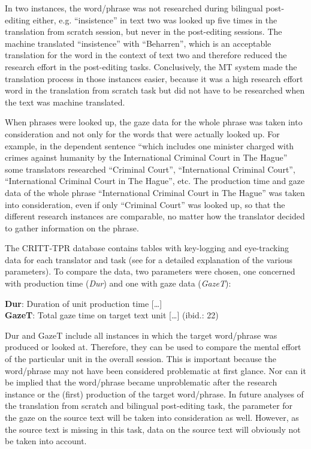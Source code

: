 \documentclass[output=paper]{langsci/langscibook}
\begin{document}
In two instances, the word/phrase was not researched during bilingual post-editing either, e.g. ``insistence'' in text two was looked up five times in the translation from scratch session, but never in the post-editing sessions. The machine translated ``insistence'' with ``Beharren'', which is an acceptable translation for the word in the context of text two and therefore reduced the research effort in the post-editing tasks. Conclusively, the MT system made the translation process in those instances easier, because it was a high research effort word in the translation from scratch task but did not have to be researched when the text was machine translated.



When phrases were looked up, the gaze data for the whole phrase was taken into consideration and not only for the words that were actually looked up. For example, in the dependent sentence ``which includes one minister charged with crimes against humanity by the International Criminal Court in The Hague'' some translators researched ``Criminal Court'', ``International Criminal Court'', ``International Criminal Court in The Hague'', etc. The production time and gaze data of the whole phrase ``International Criminal Court in The Hague'' was taken into consideration, even if only ``Criminal Court'' was looked up, so that the different research instances are comparable, no matter how the translator decided to gather information on the phrase.



The CRITT-TPR database contains tables with key-logging and eye-tracking data for each translator and task (see \citealt{carl2013} for a detailed explanation of the various parameters). To compare the data, two parameters were chosen, one concerned with production time (\textit{Dur}) and one with gaze data (\textit{GazeT}):

\ea
 \textbf{Dur}: Duration of unit production time [\ldots]\\
  \textbf{GazeT}: Total gaze time on target text unit [\ldots] (ibid.: 22) 
\z

Dur and GazeT include all instances in which the target word/phrase was produced or looked at. Therefore, they can be used to compare the mental effort of the particular unit in the overall session. This is important because the word/phrase may not have been considered problematic at first glance. Nor can it be implied that the word/phrase became unproblematic after the research instance or the (first) production of the target word/phrase. In future analyses of the translation from scratch and bilingual post-editing task, the parameter for the gaze on the source text will be taken into consideration as well. However, as the source text is missing in this task, data on the source text will obviously not be taken into account.
\end{document}
